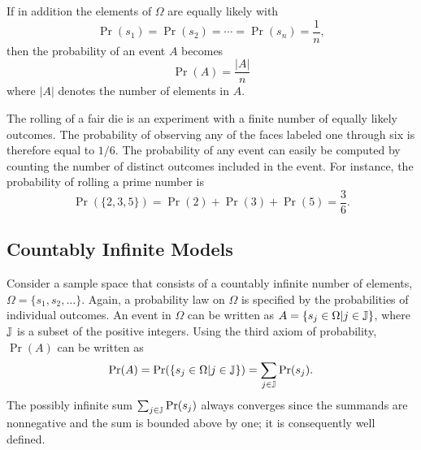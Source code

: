 If in addition the elements of $\Omega$ are equally likely with
\begin{equation*}
\Pr (s_1) = \Pr (s_2) = \cdots = \Pr (s_n) = \frac{1}{n} ,
\end{equation*}
then the probability of an event $A$ becomes
\begin{equation} \label{equation:ProbEquiProbableOutcomes}
\Pr (A) = \frac{ |A| }{n}
\end{equation}
where $|A|$ denotes the number of elements in $A$.

\begin{example}
The rolling of a fair die is an experiment with a finite number of equally likely outcomes.
The probability of observing any of the faces labeled one through six is therefore equal to $1/6$.
The probability of any event can easily be computed by counting the number of distinct outcomes included in the event.
For instance, the probability of rolling a prime number is
\begin{equation*}
\Pr ( \{ 2, 3, 5 \} )
= \Pr (2) + \Pr(3) + \Pr(5) = \frac{3}{6} .
\end{equation*}
\end{example}


\subsection{Countably Infinite Models}

Consider a sample space that consists of a countably infinite number of elements, $\Omega = \{ s_1, s_2, \ldots \}$.
Again, a probability law on $\Omega$ is specified by the probabilities of individual outcomes.
An event in $\Omega$ can be written as $A = \{ s_j \in \Omega | j \in \mathbb{J} \}$, where $\mathbb{J}$ is a subset of the positive integers.
Using the third axiom of probability, $\Pr (A)$ can be written as
\begin{equation*}
\Pr (A)
= \Pr ( \{ s_j \in \Omega | j \in \mathbb{J} \} )
= \sum_{j \in \mathbb{J}} \Pr (s_j) .
\end{equation*}
The possibly infinite sum $\sum_{j \in \mathbb{J}} \Pr (s_j)$ always converges since the summands are nonnegative and the sum is bounded above by one; it is consequently well defined.

